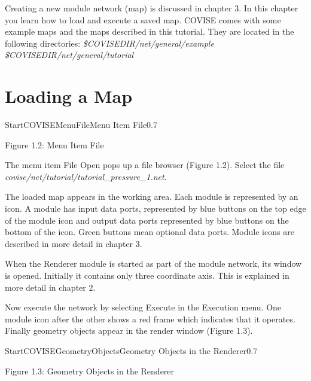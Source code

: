 Creating a new module network (map) is discussed in chapter 3. In this chapter you learn 
how to load and execute a saved map. COVISE comes with some example maps and the 
maps described in this tutorial. They are located in the following directories: 
\newline
{\it \$COVISEDIR/net/general/example}
\newline
{\it \$COVISEDIR/net/general/tutorial} 


\clearpage
\section{Loading a Map}

\begin{covimg}{StartCOVISE}{MenuFile}{Menu Item File}{0.7}\end{covimg}

\begin{htmlonly}
Figure 1.2: Menu Item File  
\vspace{0.5cm}
\end{htmlonly}

The menu item File Open pops up a file browser (Figure 1.2). Select the 
file {\it covise/net/tutorial/tutorial\_pressure\_1.net}. 

The loaded map appears in the working area. Each module is represented by an icon. 
A module has input data ports, represented by blue buttons on the top edge of the 
module icon and output data ports represented by blue buttons on the bottom of 
the icon. Green buttons mean optional data ports. Module icons are described in 
more detail in chapter 3. 

When the Renderer module is started as part of the module network, its window is 
opened. Initially it contains only three coordinate axis. This is explained in 
more detail in chapter 2. 

Now execute the network by selecting Execute in the Execution menu. One module 
icon after the other shows a red frame which indicates that it operates. Finally 
geometry objects appear in the render window (Figure 1.3). 

\begin{covimg}{StartCOVISE}{GeometryObjects}{Geometry Objects in the Renderer}{0.7}\end{covimg}
\begin{htmlonly}
Figure 1.3: Geometry Objects in the Renderer 
\vspace{0.5cm}
\end{htmlonly}

